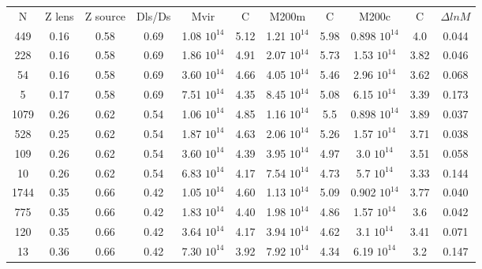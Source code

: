 \begin{table*}
        \centering
        \begin{tabular}{|c|c|c|c|c|c|c|c|c|c|c|}  
          \hline
          N & Z lens  & Z source & Dls/Ds & Mvir  & C  & M200m  &  C &  M200c & C & $\Delta ln M$ \\
          449   & 0.16   & 0.58   & 0.69   & 1.08 $10^{14}$   & 5.12   & 1.21 $10^{14}$   & 5.98   & 0.898 $10^{14}$   & 4.0    & 0.044   \\
          \hline 
          228   & 0.16   & 0.58   & 0.69   & 1.86 $10^{14}$   & 4.91   & 2.07 $10^{14}$   & 5.73   & 1.53 $10^{14}$   & 3.82    & 0.046   \\
          \hline 
          54   & 0.16   & 0.58   & 0.69   & 3.60 $10^{14}$   & 4.66   & 4.05 $10^{14}$   & 5.46   & 2.96 $10^{14}$   & 3.62    & 0.068   \\
          \hline 
          5   & 0.17   & 0.58   & 0.69   & 7.51 $10^{14}$   & 4.35   & 8.45 $10^{14}$   & 5.08   & 6.15 $10^{14}$   & 3.39    & 0.173   \\
          \hline 
          1079   & 0.26   & 0.62   & 0.54   & 1.06 $10^{14}$   & 4.85   & 1.16 $10^{14}$   & 5.5   & 0.898 $10^{14}$   & 3.89    & 0.037   \\
          \hline 
          528   & 0.25   & 0.62   & 0.54   & 1.87 $10^{14}$   & 4.63   & 2.06 $10^{14}$   & 5.26   & 1.57 $10^{14}$   & 3.71    & 0.038   \\
          \hline 
          109   & 0.26   & 0.62   & 0.54   & 3.60 $10^{14}$   & 4.39   & 3.95 $10^{14}$   & 4.97   & 3.0 $10^{14}$   & 3.51    & 0.058   \\
          \hline 
          10   & 0.26   & 0.62   & 0.54   & 6.83 $10^{14}$   & 4.17   & 7.54 $10^{14}$   & 4.73   & 5.7 $10^{14}$   & 3.33    & 0.144   \\
          \hline 
          1744   & 0.35   & 0.66   & 0.42   & 1.05 $10^{14}$   & 4.60   & 1.13 $10^{14}$   & 5.09   & 0.902 $10^{14}$   & 3.77    & 0.040   \\
          \hline 
          775   & 0.35   & 0.66   & 0.42   & 1.83 $10^{14}$   & 4.40   & 1.98 $10^{14}$   & 4.86   & 1.57 $10^{14}$   & 3.6    & 0.042   \\
          \hline 
          120   & 0.35   & 0.66   & 0.42   & 3.64 $10^{14}$   & 4.17   & 3.94 $10^{14}$   & 4.62   & 3.1 $10^{14}$   & 3.41    & 0.071   \\
          \hline 
          13   & 0.36   & 0.66   & 0.42   & 7.30 $10^{14}$   & 3.92   & 7.92 $10^{14}$   & 4.34   & 6.19 $10^{14}$   & 3.2    & 0.147  \\ 

\end{tabular}
\end{table*}
